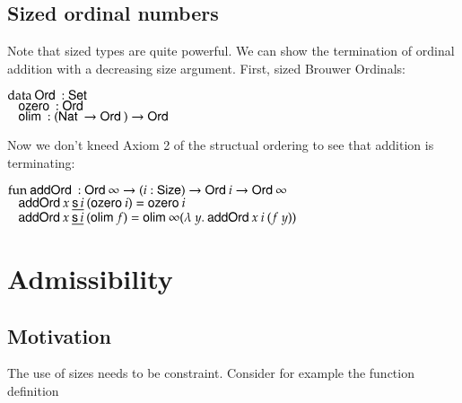 \subsection{Sized ordinal numbers}
Note that sized types are quite powerful. 
We can show the termination of ordinal addition with a decreasing size argument.
First, sized Brouwer Ordinals:
\begin{bsp}
$\mathrm{data}\: \mathsf{Ord}\: : \mathsf{Set}$ \\
$\hspace*{3mm} \mathsf{ozero}\: : \mathsf{Ord}\: $\\
$\hspace*{3mm} \mathsf{olim}\: : (\mathsf{Nat}\: \rightarrow \mathsf{Ord}\: ) \rightarrow \mathsf{Ord}\: $
\end{bsp}
Now we don't kneed Axiom 2 of the structual ordering to see that addition is terminating:
\begin{bsp}
$\mathrm{fun}\: \mathsf{addOrd}\: : \mathsf{Ord}\: \infty \rightarrow ( i : \mathsf{Size} ) \rightarrow{\mathsf{Ord}\:i \rightarrow\mathsf{Ord}\:\infty }$\\
$\hspace*{3mm} \mathsf{addOrd}\: x\: \underline{\mathsf{s}\, i}\: (\mathsf{ozero}\: i) = \mathsf{ozero}\: i $\\
$\hspace*{3mm} \mathsf{addOrd}\: x\: \underline{\mathsf{s}\, i}\: (\mathsf{olim}\: f)  = \mathsf{olim}\: \infty ( \lambda\: y .\: \mathsf{addOrd}\:  x \: i \: (f \: y))  $
\end{bsp}

\section{Admissibility}
\subsection{Motivation}
The use of sizes needs to be constraint.
Consider for example the function definition

